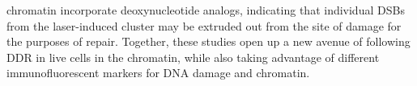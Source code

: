 chromatin incorporate deoxynucleotide analogs, indicating that individual DSBs from the laser-induced cluster may be extruded out from the site of damage for the purposes of repair. Together, these studies open up a new avenue of following DDR in live cells in the chromatin, while also taking advantage of different immunofluorescent markers for DNA damage and chromatin.